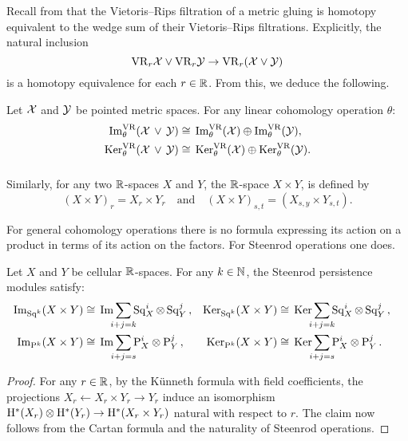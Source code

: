 Recall from \cite[Proposition 1]{adamaszek2020homotopy} that the Vietoris--Rips filtration of a metric gluing is homotopy equivalent to the wedge sum of their Vietoris--Rips filtrations.
Explicitly, the natural inclusion
\[
\mathrm{VR}_r\mathcal{X} \vee \mathrm{VR}_r\mathcal{Y} \to \mathrm{VR}_r(\mathcal{X} \vee \mathcal{Y})
\]
is a homotopy equivalence for each $r \in \mathbb{R}$.
From this, we deduce the following.

\medskip\corollary
Let $\mathcal{X}$ and $\mathcal{Y}$ be pointed metric spaces.
For any linear cohomology operation $\theta$:
\begin{align*}
	\operatorname{Im}_\theta^{\mathrm{VR}}(\mathcal{X} \, \vee \, \mathcal{Y}) &\cong \, \operatorname{Im}_\theta^{\mathrm{VR}}(\mathcal{X}) \oplus \operatorname{Im}_\theta^{\mathrm{VR}}(\mathcal{Y}), \\
	\operatorname{Ker}_\theta^{\mathrm{VR}}(\mathcal{X} \, \vee \, \mathcal{Y}) &\cong \, \operatorname{Ker}_\theta^{\mathrm{VR}}(\mathcal{X}) \oplus \operatorname{Ker}_\theta^{\mathrm{VR}}(\mathcal{Y}).
\end{align*}

\subsubsection{}

Similarly, for any two $\mathbb{R}$-spaces $X$ and $Y$, the $\mathbb{R}$-space $X \times Y$, is defined by
\[
(X \times Y)_r = X_r \times Y_r \quad\text{and}\quad (X \times Y)_{s,t} = (X_{s,y} \times Y_{s,t}).
\]

For general cohomology operations there is no formula expressing its action on a product in terms of its action on the factors.
For Steenrod operations one does.

\medskip\theorem
Let $X$ and $Y$ be cellular $\mathbb{R}$-spaces.
For any $k \in \mathbb{N}$, the Steenrod persistence modules satisfy:
\begin{align*}
	\img_{\Sq^k}(X \times Y) &\cong\, \img\sum_{\mathclap{i+j=k}} \Sq^i_X \ot \Sq^j_Y\,, &
	\ker_{\Sq^k}(X \times Y) &\cong\, \ker\sum_{\mathclap{i+j=k}} \Sq^i_X \ot \Sq^j_Y\,, \\
	\img_{\rP^k}(X \times Y) &\cong\, \img\sum_{\mathclap{i+j=s}} \rP^i_X \otimes \rP^j_Y\,, &
	\ker_{\rP^k}(X \times Y) &\cong\, \ker\sum_{\mathclap{i+j=s}} \rP^i_X \otimes \rP^j_Y\,. &
\end{align*}

\begin{proof}
	For any \(r \in \mathbb{R}\), by the K\"unneth formula with field coefficients, the projections $X_r \leftarrow X_r \times Y_r \to Y_r$ induce an isomorphism $\mathrm{H}^*(X_r) \otimes \mathrm{H}^*(Y_r) \to \mathrm{H}^*(X_r \times Y_r)$ natural with respect to \(r\).
	The claim now follows from the Cartan formula and the naturality of Steenrod operations.
\end{proof}

